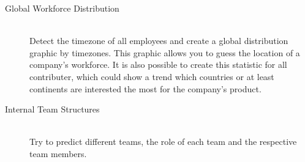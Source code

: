 \begin{description}
    \item[Global Workforce Distribution] \hfill \\
        Detect the timezone of all employees and create a global distribution graphic by timezones.
        This graphic allows you to guess the location of a company's workforce.
        It is also possible to create this statistic for all contributer, which could show a trend which countries or at least continents are interested the most for the company's product.

    \item[Internal Team Structures] \hfill \\
        Try to predict different teams, the role of each team and the respective team members.
\end{description}
